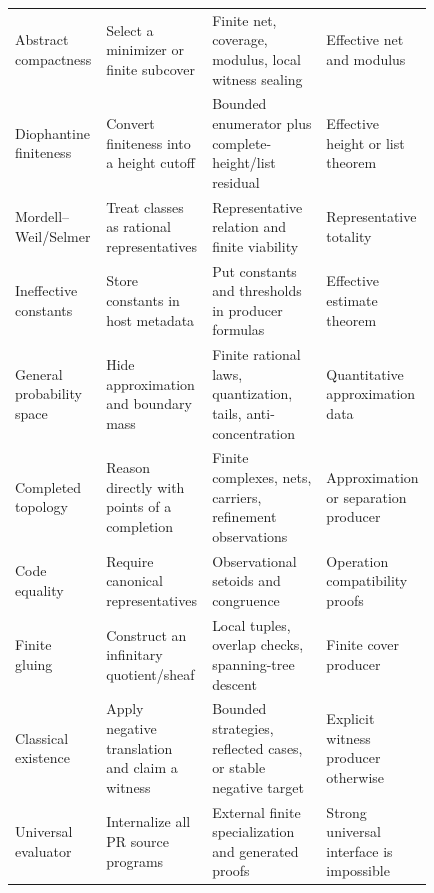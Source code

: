 \begin{longtable}{Y{0.17\linewidth}Y{0.24\linewidth}Y{0.27\linewidth}Y{0.15\linewidth}}
Abstract compactness & Select a minimizer or finite subcover & Finite net, coverage, modulus, local witness sealing & Effective net and modulus\\
Diophantine finiteness & Convert finiteness into a height cutoff & Bounded enumerator plus complete-height/list residual & Effective height or list theorem\\
Mordell--Weil/Selmer & Treat classes as rational representatives & Representative relation and finite viability & Representative totality\\
Ineffective constants & Store constants in host metadata & Put constants and thresholds in producer formulas & Effective estimate theorem\\
General probability space & Hide approximation and boundary mass & Finite rational laws, quantization, tails, anti-concentration & Quantitative approximation data\\
Completed topology & Reason directly with points of a completion & Finite complexes, nets, carriers, refinement observations & Approximation or separation producer\\
Code equality & Require canonical representatives & Observational setoids and congruence & Operation compatibility proofs\\
Finite gluing & Construct an infinitary quotient/sheaf & Local tuples, overlap checks, spanning-tree descent & Finite cover producer\\
Classical existence & Apply negative translation and claim a witness & Bounded strategies, reflected cases, or stable negative target & Explicit witness producer otherwise\\
Universal evaluator & Internalize all PR source programs & External finite specialization and generated proofs & Strong universal interface is impossible\\
\bottomrule
\end{longtable}
\setlength{\tabcolsep}{6pt}
\normalsize
